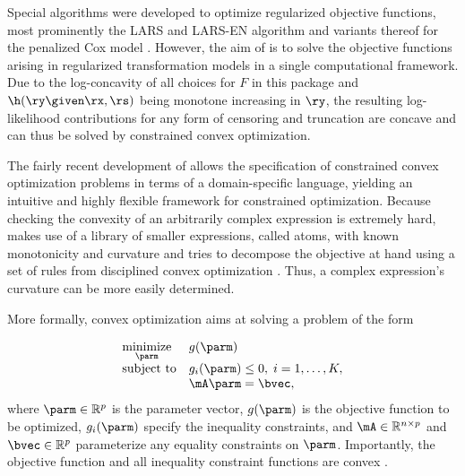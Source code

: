 Special algorithms were developed to optimize regularized objective functions,
most prominently the LARS and LARS-EN algorithm \citep{efron2004} and variants
thereof for the penalized Cox model \citep{penalizedpaper}. However, the aim of
 is to solve the objective functions arising in regularized transformation
models in a single computational framework.
Due to the log-concavity of all choices for $F$ in this package and $\h(\ry\given\rx,\rs)$ being
monotone increasing in $\ry$, the resulting log-likelihood contributions for any
form of censoring and truncation are concave and can thus be solved by constrained
convex optimization.

The fairly recent development of  allows the specification of constrained
convex optimization problems in terms of a domain-specific language, yielding
an intuitive and highly flexible framework for constrained optimization. Because
checking the convexity of an arbitrarily complex expression is extremely hard,
 makes use of a library of smaller expressions, called atoms, with known
monotonicity and curvature and tries to decompose the objective at hand using a
set of rules from disciplined convex optimization \citep[DCP,][]{DCPpaper}. Thus, a
complex expression's curvature can be more easily determined.

More formally, convex optimization aims at solving a problem of the form

\begin{align*}
  \begin{array}{ll}
  	\underset{\parm}{\mbox{minimize}} & g(\parm) \\
  	\mbox{subject to} & g_i(\parm) \leq 0, \; i = 1, \dots, K, \\
  	& \mA\parm = \bvec,
  \end{array}
\end{align*}
where $\parm \in \mathbb{R}^p$ is the parameter vector, $g(\parm)$ is the objective
function to be optimized, $g_i(\parm)$ specify the inequality constraints, and
$\mA \in \mathbb{R}^{n \times p}$ and $\bvec \in \mathbb{R}^p$ parameterize any
equality constraints on $\parm$. Importantly, the objective function and all
inequality constraint functions are convex \citep{boyd2004convex}.


